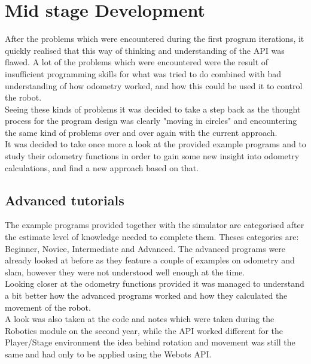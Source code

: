 \section{Mid stage Development}
After the problems which were encountered during the first program iterations, it quickly realised that this way of thinking and understanding of the API was flawed. A lot of the problems which were encountered were the result of insufficient programming skills for what  was tried to do combined with bad understanding of how odometry worked, and how this could be used it to control the robot.\\
Seeing these kinds of problems it was decided to take a step back as the thought process for the program design was clearly "moving in circles" and encountering the same kind of problems over and over again with the current approach. \\
It was decided to take once more a look at the provided example programs and to study their odometry functions in order to gain some new insight into odometry calculations, and find a new approach based on that.

\subsection{Advanced tutorials}
The example programs provided together with the simulator are categorised after the estimate level of knowledge needed to complete them. Theses categories are: Beginner, Novice, Intermediate and Advanced. The advanced programs were already looked at before as they feature a couple of examples on odometry and slam, however they were not understood  well enough at the time.\\ 
Looking closer at the odometry functions provided it was managed to understand a bit better how the advanced programs worked and how they calculated the movement of the robot. \\[3ex]

A look was also taken at the code and notes which were taken during the Robotics module on the second year, while the API worked different for the Player/Stage environment the idea behind rotation and movement was still the same and had only to be applied using the Webots API.

